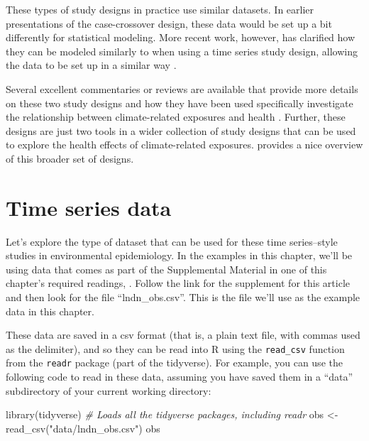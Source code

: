 \documentclass[
]{book}
\newenvironment{Shaded}{\begin{snugshade}}{\end{snugshade}}
\newcommand{\CommentTok}[1]{\textcolor[rgb]{0.56,0.35,0.01}{\textit{#1}}}
\newcommand{\FunctionTok}[1]{\textcolor[rgb]{0.00,0.00,0.00}{#1}}
\newcommand{\NormalTok}[1]{#1}
\newcommand{\OtherTok}[1]{\textcolor[rgb]{0.56,0.35,0.01}{#1}}
\newcommand{\StringTok}[1]{\textcolor[rgb]{0.31,0.60,0.02}{#1}}
\begin{document}
These types of study designs in practice use similar datasets. In earlier
presentations of the case-crossover design, these data would be set up a bit
differently for statistical modeling. More recent work, however, has clarified
how they can be modeled similarly to when using a time series study design,
allowing the data to be set up in a similar way \citep{armstrong2014conditional}.

Several excellent commentaries or reviews are available that provide more
details on these two study designs and how they have been used specifically
investigate the relationship between climate-related exposures and health \citep{bhaskaran2013time, armstrong2006models, gasparrini2010time}.
Further, these designs are just two tools in a wider collection of study designs
that can be used to explore the health effects of climate-related exposures.
\citet{dominici2008statistical1} provides a nice overview of this broader set of designs.

\hypertarget{time-series-data}{%
\section{Time series data}\label{time-series-data}}

Let's explore the type of dataset that can be used for these
time series--style studies in environmental epidemiology. In the examples
in this chapter, we'll be using data that comes as part of the Supplemental
Material in one of this chapter's required readings, \citep{vicedo2019hands}.
Follow the link for the supplement for this article and then look for the
file ``lndn\_obs.csv''. This is the file we'll use as the example data in this
chapter.

These data are saved in a csv format (that is, a plain text file, with commas
used as the delimiter), and so they can be read into R using the \texttt{read\_csv}
function from the \texttt{readr} package (part of the tidyverse). For example, you can
use the following code to read in these data, assuming you have saved them in a
``data'' subdirectory of your current working directory:

\begin{Shaded}
\begin{Highlighting}[]
\FunctionTok{library}\NormalTok{(tidyverse) }\CommentTok{\# Loads all the tidyverse packages, including readr}
\NormalTok{obs }\OtherTok{\textless{}{-}} \FunctionTok{read\_csv}\NormalTok{(}\StringTok{"data/lndn\_obs.csv"}\NormalTok{)}
\NormalTok{obs}
\end{Highlighting}
\end{Shaded}
\end{document}
